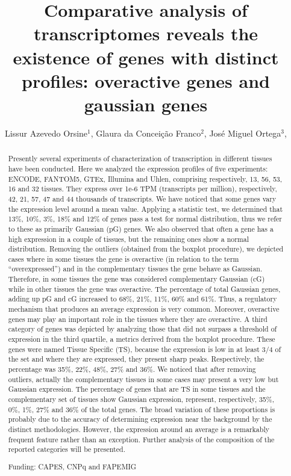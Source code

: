 \documentclass[twoside]{article}
\title{\vspace{-15mm}\fontsize{24pt}{10pt}\selectfont\textbf{ Comparative analysis of transcriptomes reveals the existence of genes with distinct profiles: overactive genes and gaussian genes }} %
\author{ Lissur Azevedo Orsine$^{1}$, Glaura da Conceição Franco$^{2}$, José Miguel Ortega$^{3}$, }
\affil{ 1 UFMG

2 Departamento de Estatística, Universidade Federal de Minas Gerais

3 Universidade Federal de Minas Gerais. Laboratório de Biodados

 }
\date{}
\begin{document}
  
  
  \maketitle %
  
  
  \thispagestyle{fancy} %
  
  
  \begin{abstract}
  Presently several experiments of characterization of transcription in different tissues have been conducted. Here we analyzed the expression profiles of five experiments: ENCODE, FANTOM5, GTEx, Illumina and Uhlen, comprising respectively, 13, 56, 53, 16 and 32 tissues. They express over 1e-6 TPM (transcripts per million), respectively, 42, 21, 57, 47 and 44 thousands of transcripts. We have noticed that some genes vary the expression level around a mean value. Applying a statistic test, we determined that 13\%, 10\%, 3\%, 18\% and 12\% of genes pass a test for normal distribution, thus we refer to these as primarily Gaussian  (pG) genes. We also observed that often a gene has a high expression in a couple of tissues, but the remaining ones show a normal distribution. Removing the outliers (obtained from the boxplot procedure), we depicted cases where in some tissues the gene is overactive (in relation to the term “overexpressed”) and in the complementary tissues the gene behave as Gaussian. Therefore, in some tissues the gene was considered complementary Gaussian (cG) while in other tissues the gene was overactive. The percentage of total Gaussian genes, adding up pG and cG increased to 68\%, 21\%, 11\%, 60\% and 61\%. Thus, a regulatory mechanism that produces an average expression is very common. Moreover, overactive genes may play an important role in the tissues where they are overactive. A third category of genes was depicted by analyzing those that did not surpass a threshold of expression in the third quartile, a metrics derived from the boxplot procedure. These genes were named Tissue Specific (TS), because the expression is low in at least 3/4 of the set and where they are expressed, they present sharp peaks. Respectively, the percentage was 35\%, 22\%, 48\%, 27\% and 36\%. We noticed that after removing outliers, actually the complementary tissues in some cases may present a very low but Gaussian expression. The percentage of genes that are TS in some tissues and the complementary set of tissues show Gaussian expression, represent, respectively, 35\%, 0\%, 1\%, 27\% and 36\% of the total genes. The broad variation of these proportions is probably due to the accuracy of determining expression near the background by the distinct methodologies. However, the expression around an average is a remarkably frequent feature rather than an exception. Further analysis of the composition of the reported categories will be presented.
  
  Funding: CAPES, CNPq and FAPEMIG \\ 
  \end{abstract}
  
\end{document}
